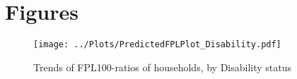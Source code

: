 
\section{Figures}

\begin{figure}[H]
\caption{Trends of FPL100-ratios of households, by Disability status}
\centering
\texttt{[image: ../Plots/PredictedFPLPlot\_Disability.pdf]}
\label{fig:disability}
\end{figure}





